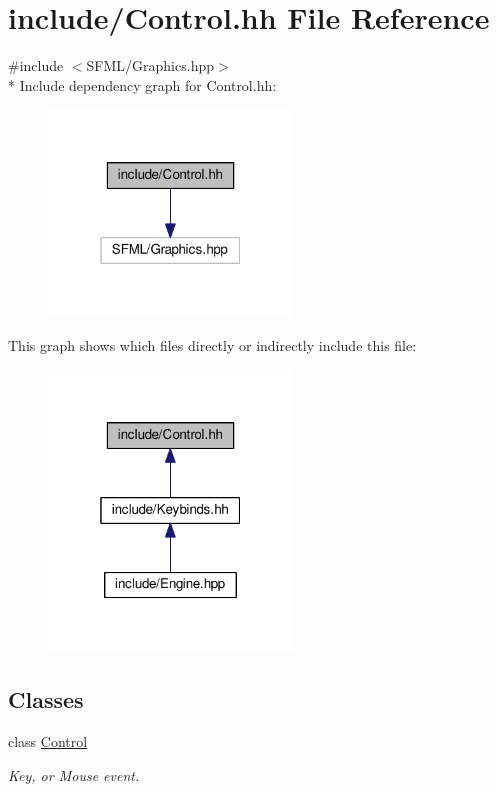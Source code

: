 \hypertarget{Control_8hh}{}\section{include/\+Control.hh File Reference}
\label{Control_8hh}
{\ttfamily \#include $<$S\+F\+M\+L/\+Graphics.\+hpp$>$}\\*
Include dependency graph for Control.\+hh\+:\nopagebreak
\begin{figure}[H]
\begin{center}
\leavevmode
\includegraphics[width=184pt]{Control_8hh__incl}
\end{center}
\end{figure}
This graph shows which files directly or indirectly include this file\+:\nopagebreak
\begin{figure}[H]
\begin{center}
\leavevmode
\includegraphics[width=184pt]{Control_8hh__dep__incl}
\end{center}
\end{figure}
\subsection*{Classes}
\begin{DoxyCompactItemize}
\item 
class \hyperlink{classControl}{Control}
\begin{DoxyCompactList}\small\item\em Key, or Mouse event. \end{DoxyCompactList}\end{DoxyCompactItemize}
